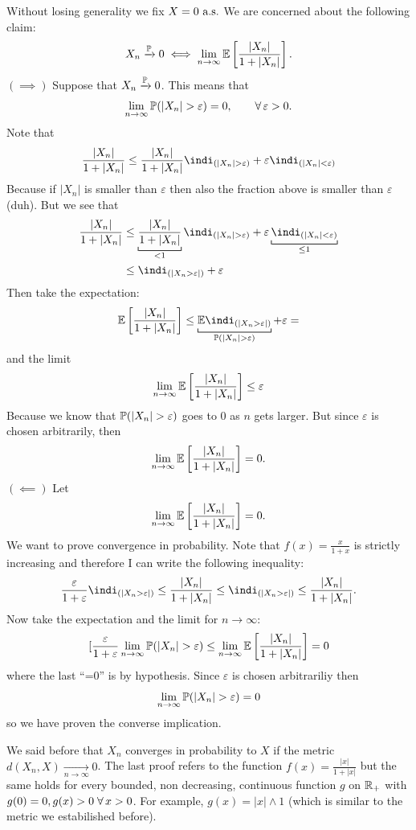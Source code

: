 \documentclass{report}
\begin{document}
\begin{fancyproof}
	Without losing generality we fix $X=0\text{ a.s.}$ We are concerned about the following claim:
	\[X_n\xrightarrow[]{\mathbb{P}} 0\iff\lim_{n\to\infty}\mathbb{E}\left[\frac{|X_n|}{1+|X_n|}\right].\]
	$(\implies)$ Suppose that $X_n\xrightarrow[]{\mathbb{P}} 0$. This means that 
	\[\lim_{n\to\infty}\pr(|X_n|>\varepsilon)=0,\qquad\every \varepsilon>0.\]
	Note that
	\[\frac{|X_n|}{1+|X_n|}\leq\frac{|X_n|}{1+|X_n|}\indi_{\left(|X_n|>\varepsilon\right)}+\varepsilon\indi_{\left(|X_n|<\varepsilon\right)}\]
	Because if $|X_n|$ is smaller than $\varepsilon$ then also the fraction above is smaller than $\varepsilon$ (duh). But we see that
	\begin{align*}
		\frac{|X_n|}{1+|X_n|}&\leq\underbracket[0.6pt]{\frac{|X_n|}{1+|X_n|}}_{<1}\indi_{\left(|X_n|>\varepsilon\right)}+\varepsilon\underbracket[0.6pt]{\indi_{\left(|X_n|<\varepsilon\right)}}_{\leq1}\\
		&\leq\indi_{(|X_n>\varepsilon|)}+\varepsilon
	\end{align*}
	Then take the expectation:
	\[\ev\left[\frac{|X_n|}{1+|X_n|}\right]\leq\underbracket[0.6pt]{\ev\indi_{(|X_n>\varepsilon|)}}_{\pr(|X_n|>\varepsilon)}+\varepsilon=\]
	and the limit
	\[\lim_{n\to\infty}\mathbb{E}\left[\frac{|X_n|}{1+|X_n|}\right]\leq\varepsilon\]
	Because we know that $\pr(|X_n|>\varepsilon)$ goes to 0 as $n$ gets larger. But since $\varepsilon$ is chosen arbitrarily, then
	\[\lim_{n\to\infty}\mathbb{E}\left[\frac{|X_n|}{1+|X_n|}\right]=0.\]
	$(\impliedby)$ Let 
	\[\lim_{n\to\infty}\mathbb{E}\left[\frac{|X_n|}{1+|X_n|}\right]=0.\]
	We want to prove convergence in probability. Note that $f(x)=\frac{x}{1+x}$ is strictly increasing and therefore I can write the following inequality:
	\[\frac{\varepsilon}{1+\varepsilon}\indi_{(|X_n>\varepsilon|)}\leq\frac{|X_n|}{1+|X_n|}\leq\indi_{(|X_n>\varepsilon|)}\leq\frac{|X_n|}{1+|X_n|}.\]
	Now take the expectation and the limit for $n\to\infty$:
	\[[\frac{\varepsilon}{1+\varepsilon}\lim_{n\to\infty}\pr(|X_n|>\varepsilon)\leq\lim_{n\to\infty}\ev\left[\frac{|X_n|}{1+|X_n|}\right]=0\]
	where the last ``=0'' is by hypothesis. Since $\varepsilon$ is chosen arbitrariliy then
	\[\lim_{n\to\infty}\pr(|X_n|>\varepsilon)=0\]
	so we have proven the converse implication.
\end{fancyproof}
We said before that $X_n$ converges in probability to $X$ if the metric $d(X_n,X)\xrightarrow[n\to\infty]{}0$. The last proof refers to the function $f(x)=\frac{|x|}{1+|x|}$ but the same holds for every bounded, non decreasing, continuous function $g$ on $\mathbb{R}_+$ with $g(0)=0,g(x)>0\;\forall\, x>0$. For example, $g(x)=|x|\wedge 1$ (which is similar to the metric we estabilished before).
\end{document}
